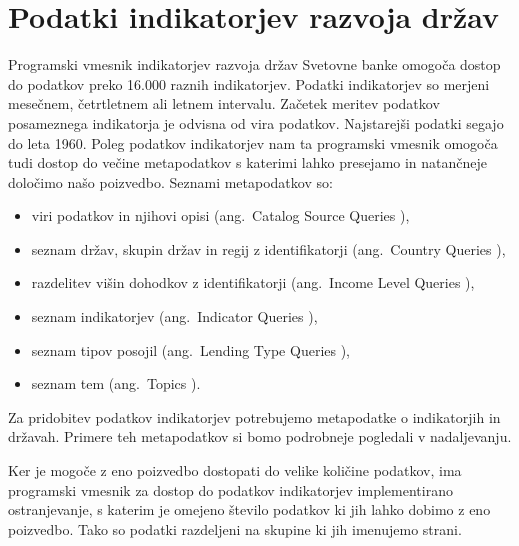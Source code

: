 \section{Podatki indikatorjev razvoja držav}
\label{sec:podatki_ind_razvoja}



Programski vmesnik indikatorjev razvoja držav Svetovne banke omogoča dostop
do podatkov preko 16.000 raznih indikatorjev. Podatki indikatorjev so merjeni
mesečnem, četrtletnem ali letnem intervalu. Začetek meritev podatkov
posameznega indikatorja je odvisna od vira podatkov. Najstarejši podatki segajo
do leta 1960. Poleg podatkov indikatorjev nam ta programski vmesnik omogoča 
tudi dostop do večine metapodatkov s katerimi lahko presejamo in natančneje
določimo našo poizvedbo. Seznami metapodatkov so:
\begin{itemize}
\item viri podatkov in njihovi opisi (ang.\ Catalog Source Queries
	),
\item seznam držav, skupin držav in regij z identifikatorji (ang.\ Country Queries
	),
\item razdelitev višin dohodkov z identifikatorji (ang.\ Income Level Queries
	),
\item seznam indikatorjev (ang.\ Indicator Queries
  ),
\item seznam tipov posojil (ang.\ Lending Type Queries
	),
\item seznam tem (ang.\ Topics ).
\end{itemize}

Za pridobitev podatkov indikatorjev potrebujemo metapodatke o indikatorjih in
državah. Primere teh metapodatkov si bomo podrobneje pogledali v nadaljevanju.

Ker je mogoče z eno poizvedbo dostopati do velike količine podatkov, ima
programski vmesnik za dostop do podatkov indikatorjev implementirano
ostranjevanje, s katerim je omejeno število podatkov ki jih lahko dobimo z eno
poizvedbo. Tako so podatki razdeljeni na skupine ki jih imenujemo strani.

